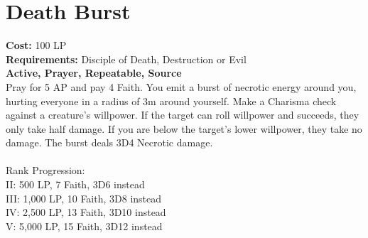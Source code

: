 \section{Death Burst}\label{prayer:deathBurst}
\textbf{Cost:} 100 LP\\
\textbf{Requirements:} Disciple of Death, Destruction or Evil \\
\textbf{Active, Prayer, Repeatable, Source}\\
Pray for 5 AP and pay 4 Faith.
You emit a burst of necrotic energy around you, hurting everyone in a radius of 3m around yourself.
Make a Charisma check against a creature's willpower.
If the target can roll willpower and succeeds, they only take half damage.
If you are below the target's lower willpower, they take no damage.
The burst deals 3D4 Necrotic damage.\\
\\
Rank Progression:\\
II: 500 LP, 7 Faith, 3D6 instead\\
III: 1,000 LP, 10 Faith, 3D8 instead\\
IV: 2,500 LP, 13 Faith, 3D10 instead\\
V: 5,000 LP, 15 Faith, 3D12 instead\\
